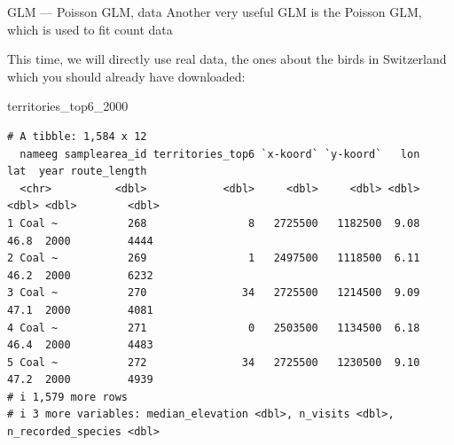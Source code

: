 \documentclass[
  10pt,
  ignorenonframetext,
  aspectratio=169,
  t]{beamer}
\newenvironment{Shaded}{\begin{snugshade}}{\end{snugshade}}
\newcommand{\NormalTok}[1]{\textcolor[rgb]{0.00,0.23,0.31}{#1}}
\begin{document}
\begin{frame}[fragile]{GLM --- Poisson GLM, data}
\protect{}\label{glm-poisson-glm-data-1}
Another very useful GLM is the Poisson GLM, which is used to fit count
data

This time, we will directly use real data, the ones about the birds in
Switzerland which you should already have downloaded:

\footnotesize

\begin{Shaded}
\begin{Highlighting}[]
\NormalTok{territories\_top6\_2000}
\end{Highlighting}
\end{Shaded}

\begin{verbatim}
# A tibble: 1,584 x 12
  nameeg samplearea_id territories_top6 `x-koord` `y-koord`   lon   lat  year route_length
  <chr>          <dbl>            <dbl>     <dbl>     <dbl> <dbl> <dbl> <dbl>        <dbl>
1 Coal ~           268                8   2725500   1182500  9.08  46.8  2000         4444
2 Coal ~           269                1   2497500   1118500  6.11  46.2  2000         6232
3 Coal ~           270               34   2725500   1214500  9.09  47.1  2000         4081
4 Coal ~           271                0   2503500   1134500  6.18  46.4  2000         4483
5 Coal ~           272               34   2725500   1230500  9.10  47.2  2000         4939
# i 1,579 more rows
# i 3 more variables: median_elevation <dbl>, n_visits <dbl>, n_recorded_species <dbl>
\end{verbatim}

\normalsize
\end{frame}
\end{document}
